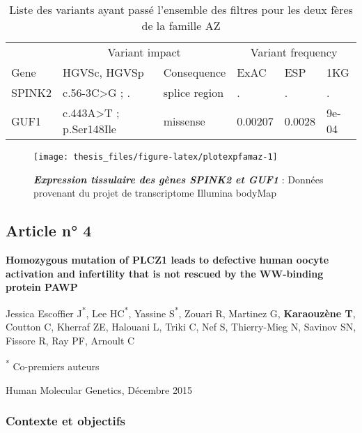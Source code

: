 \documentclass[12pt,twoside]{ugathesis}
\begin{document}
\begin{longtable}[t]{llllll}
\caption{\label{tab:tabrecapaz}Liste des variants ayant passé l'ensemble des filtres pour les deux fères de la famille AZ}\\
\toprule
\multicolumn{1}{c}{ } & \multicolumn{2}{c}{Variant impact} & \multicolumn{3}{c}{Variant frequency} \\
\cmidrule(l{2pt}r{2pt}){2-3} \cmidrule(l{2pt}r{2pt}){4-6}
Gene & HGVSc, HGVSp & Consequence & ExAC & ESP & 1KG\\
\midrule
SPINK2 & c.56-3C>G ; . & splice region & . & . & .\\
GUF1 & c.443A>T ; p.Ser148Ile & missense & 0.00207 & 0.0028 & 9e-04\\
\bottomrule
\end{longtable}

\newpage

\begin{figure}

{\centering \texttt{[image: thesis\_files/figure-latex/plotexpfamaz-1]} 

}

\caption[Expression tissulaire des gènes *SPINK2* et *GUF1*]{\textbf{\emph{Expression tissulaire des gènes
\emph{SPINK2} et \emph{GUF1}}} : Données provenant du projet de
transcriptome Illumina bodyMap}\label{fig:plotexpfamaz}
\end{figure}





\newpage

\subsection{Article n° 4}\label{article-n-4}

\textbf{Homozygous mutation of PLCZ1 leads to defective human oocyte
activation and infertility that is not rescued by the WW-binding protein
PAWP}

Jessica Escoffier J\textsuperscript{*}, Lee HC\textsuperscript{*},
Yassine S\textsuperscript{*}, Zouari R, Martinez G, \textbf{Karaouzène
T}, Coutton C, Kherraf ZE, Halouani L, Triki C, Nef S, Thierry-Mieg N,
Savinov SN, Fissore R, Ray PF, Arnoult C

\textsuperscript{*} Co-premiers auteurs

Human Molecular Genetics, Décembre 2015

\newpage

\subsubsection{Contexte et objectifs}\label{contexte-et-objectifs-1}
\end{document}
